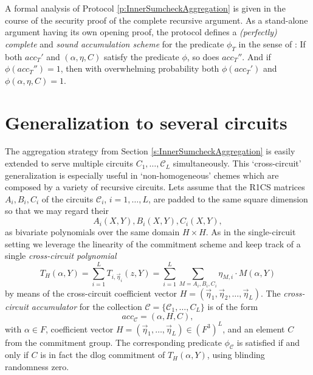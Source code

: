 \documentclass[10pt,article,oneside]{memoir}
\theoremstyle{definition}
\theoremstyle{remark}
\begin{document}
A formal analysis of Protocol \ref{p:InnerSumcheckAggregation} is given in the course of the security proof of the complete recursive argument.
As a stand-alone argument having its own opening proof, the protocol defines a \textit{(perfectly) complete} and \textit{sound accumulation scheme} for the predicate $\phi_T$ in the sense of \cite{Buenz}: %
If both $acc_T'$ and $(\alpha,\eta,C)$ satisfy the predicate $\phi$, so does $acc_T''$.
And if $\phi(acc_T'')=1$, then with overwhelming probability both $\phi(acc_T')$ and $\phi(\alpha,\eta,C)=1$.


\section{Generalization to several circuits} 
\label{s:InnerSumcheckAggregationGeneral}

The aggregation strategy from Section \ref{s:InnerSumcheckAggregation} is easily extended to serve multiple circuits  $C_1,\ldots, \mathcal C_L$ simultaneously.
This `cross-circuit' generalization is especially useful in `non-homogeneous' chemes which are composed by a variety of recursive circuits.
%
Lets assume that the R1CS matrices $A_i,B_i,C_i$ of the circuits $\mathcal C_i$, $i=1,\ldots,L$, are padded to the same square dimension so that we may regard their
\[
A_i(X,Y), B_i(X,Y), C_i(X,Y),
\]
as bivariate polynomials over the same domain $H\times H$.
As in the single-circuit setting we leverage the linearity of the commitment scheme and keep track of a single \textit{cross-circuit polynomial}
\begin{equation}
\label{e:CrossCircuitT}
T_{H}(\alpha,Y)=\sum_{i=1}^L T_{i, \vec\eta_i}(z,Y)= \sum_{i=1}^L \sum_{M= A_i,B_i,C_i} \eta_{M,i}\cdot M(\alpha, Y)
\end{equation}
by means of the cross-circuit coefficient vector $H=(\vec\eta_1,\vec\eta_2, \ldots, \vec\eta_L)$.
The \textit{cross-circuit accumulator} for the collection $\mathcal C=\{\mathcal C_1,\ldots, C_L\}$ is of the form
\[
acc_\mathcal C= (\alpha, H, C),
\]
with $\alpha\in F$, coefficient vector $H=(\vec\eta_1,\ldots, \vec\eta_L)\in (F^{3})^L$, and an element $C$ from the commitment group.
The corresponding predicate $\phi_\mathcal C$ is satisfied if and only if $C$ is in fact the dlog commitment of $T_H(\alpha,Y)$, using blinding randomness zero.
\end{document}
